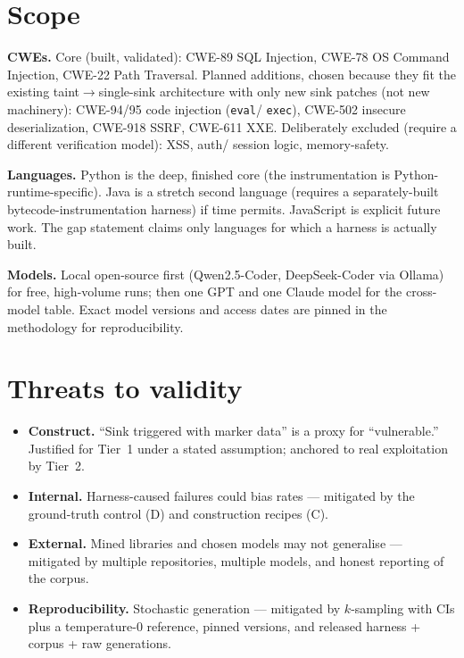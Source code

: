 \documentclass[11pt]{article}
\begin{document}
\section{Scope}

\textbf{CWEs.} Core (built, validated): CWE-89 SQL Injection, CWE-78 OS
Command Injection, CWE-22 Path Traversal. Planned additions, chosen because
they fit the existing taint$\to$single-sink architecture with only new sink
patches (not new machinery): CWE-94/95 code injection (\texttt{eval}/
\texttt{exec}), CWE-502 insecure deserialization, CWE-918 SSRF, CWE-611 XXE.
Deliberately excluded (require a different verification model): XSS, auth/
session logic, memory-safety.

\textbf{Languages.} Python is the deep, finished core (the instrumentation
is Python-runtime-specific). Java is a stretch second language (requires a
separately-built bytecode-instrumentation harness) if time permits.
JavaScript is explicit future work. The gap statement claims only languages
for which a harness is actually built.

\textbf{Models.} Local open-source first (Qwen2.5-Coder, DeepSeek-Coder via
Ollama) for free, high-volume runs; then one GPT and one Claude model for
the cross-model table. Exact model versions and access dates are pinned in
the methodology for reproducibility.

\section{Threats to validity}

\begin{itemize}[leftmargin=1.4em,itemsep=1pt,topsep=2pt]
  \item \textbf{Construct.} ``Sink triggered with marker data'' is a proxy
  for ``vulnerable.'' Justified for Tier~1 under a stated assumption;
  anchored to real exploitation by Tier~2.
  \item \textbf{Internal.} Harness-caused failures could bias rates ---
  mitigated by the ground-truth control (D) and construction recipes (C).
  \item \textbf{External.} Mined libraries and chosen models may not
  generalise --- mitigated by multiple repositories, multiple models, and
  honest reporting of the corpus.
  \item \textbf{Reproducibility.} Stochastic generation --- mitigated by
  $k$-sampling with CIs plus a temperature-0 reference, pinned versions,
  and released harness + corpus + raw generations.
\end{itemize}
\end{document}
